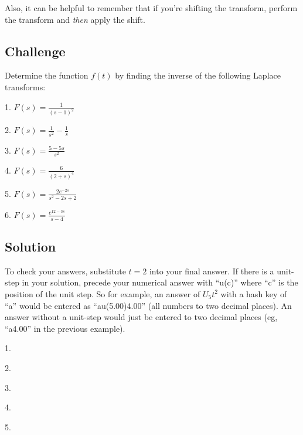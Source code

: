 Also, it can be helpful to remember that if you're shifting the transform, perform the transform and \emph{then} apply the shift.

\subsection*{Challenge}
Determine the function $f(t)$ by finding the inverse of the following Laplace transforms:

1. $\displaystyle F(s)=\frac{1}{(s-1)^2}$

2. $\displaystyle F(s)=\frac{1}{s^2} - \frac{1}{s}$


3. $\displaystyle F(s)=\frac{5-5s}{s^2}$

4. $\displaystyle F(s)=\frac{6}{(2+s)^4}$


5. $\displaystyle F(s)=\frac{2 e^{-2s}}{s^2-2s+2}$

6. $\displaystyle F(s)=\frac{e^{12-3s}}{s-4}$

\subsection*{Solution}
To check your answers, substitute $t=2$ into your final answer. If there is a unit-step in your solution, precede your numerical answer with ``u(c)'' where ``c'' is the position of the unit step. So for example, an answer of $U_5 t^2$ with a hash key of ``a'' would be entered as ``au(5.00)4.00'' (all numbers to two decimal places). An answer without a unit-step would just be entered to two decimal places (eg, ``a4.00'' in the previous example).

1.\\

2.\\


3.\\

4.\\


5.\\

